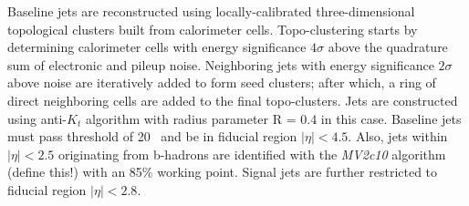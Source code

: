 Baseline jets are reconstructed using locally-calibrated three-dimensional topological clusters built from calorimeter cells.  Topo-clustering starts by determining calorimeter cells with energy significance $4\sigma$ above the quadrature sum of electronic and pileup noise.  Neighboring jets with energy significance $2\sigma$ above noise are iteratively added to form seed clusters; after which, a ring of direct neighboring cells are added to the final topo-clusters.  Jets are constructed using anti-$K_t$ algorithm with radius parameter R = 0.4 in this case. Baseline jets must pass \pt{} threshold of 20 ~\GeV and be in fiducial region $|\eta | < 4.5$.  Also, jets within $|\eta | < 2.5$ originating from b-hadrons are identified with the \textit{MV2c10} algorithm (define this!) with an 85\% working point.  Signal jets are further restricted to fiducial region $|\eta | < 2.8$.




